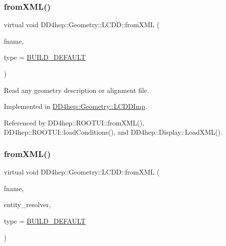 \subsubsection{\texorpdfstring{from\+X\+M\+L()}{fromXML()}\hspace{0.1cm}{\footnotesize\ttfamily [1/2]}}
{\footnotesize\ttfamily virtual void D\+D4hep\+::\+Geometry\+::\+L\+C\+D\+D\+::from\+X\+ML (\begin{DoxyParamCaption}\item[{const std\+::string \&}]{fname,  }\item[{\hyperlink{namespace_d_d4hep_acafe43ba4537ab6e999e808142965fab}{L\+C\+D\+D\+Build\+Type}}]{type = {\ttfamily \hyperlink{namespace_d_d4hep_acafe43ba4537ab6e999e808142965fabaceac720f961afd2369fcc9f343113a2e}{B\+U\+I\+L\+D\+\_\+\+D\+E\+F\+A\+U\+LT}} }\end{DoxyParamCaption})\hspace{0.3cm}{\ttfamily [pure virtual]}}



Read any geometry description or alignment file. 



Implemented in \hyperlink{class_d_d4hep_1_1_geometry_1_1_l_c_d_d_imp_ade843dae125e811b1ce48f7bfa2dc0ef}{D\+D4hep\+::\+Geometry\+::\+L\+C\+D\+D\+Imp}.



Referenced by D\+D4hep\+::\+R\+O\+O\+T\+U\+I\+::from\+X\+M\+L(), D\+D4hep\+::\+R\+O\+O\+T\+U\+I\+::load\+Conditions(), and D\+D4hep\+::\+Display\+::\+Load\+X\+M\+L().

\hypertarget{class_d_d4hep_1_1_geometry_1_1_l_c_d_d_aab90efbd334c08ee8a06b0f97d219243}{}\label{class_d_d4hep_1_1_geometry_1_1_l_c_d_d_aab90efbd334c08ee8a06b0f97d219243} 
\subsubsection{\texorpdfstring{from\+X\+M\+L()}{fromXML()}\hspace{0.1cm}{\footnotesize\ttfamily [2/2]}}
{\footnotesize\ttfamily virtual void D\+D4hep\+::\+Geometry\+::\+L\+C\+D\+D\+::from\+X\+ML (\begin{DoxyParamCaption}\item[{const std\+::string \&}]{fname,  }\item[{\hyperlink{class_d_d4hep_1_1_geometry_1_1_l_c_d_d_a69f1e3e4fbcef1d57f1df1c2bd85918f}{Uri\+Reader} $\ast$}]{entity\+\_\+resolver,  }\item[{\hyperlink{namespace_d_d4hep_acafe43ba4537ab6e999e808142965fab}{L\+C\+D\+D\+Build\+Type}}]{type = {\ttfamily \hyperlink{namespace_d_d4hep_acafe43ba4537ab6e999e808142965fabaceac720f961afd2369fcc9f343113a2e}{B\+U\+I\+L\+D\+\_\+\+D\+E\+F\+A\+U\+LT}} }\end{DoxyParamCaption})\hspace{0.3cm}{\ttfamily [pure virtual]}}



